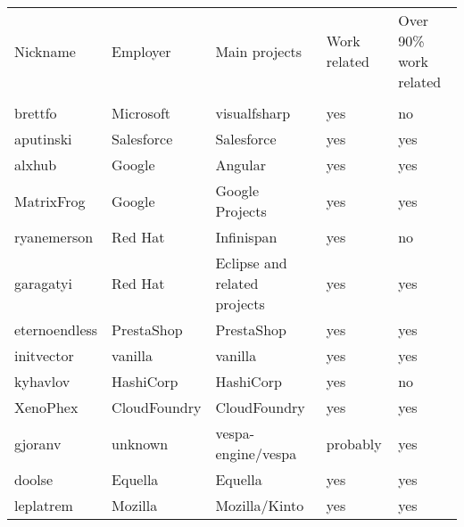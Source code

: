 \begin{landscape}
    \begin{table}[]
        \centering
        \label{tbl:employee-cluster-evaluation}
        \begin{tabular}{lllll}
            Nickname      & Employer     & Main projects                & Work related & Over 90\% work related \\
                          &              &                              &              &                        \\
            brettfo       & Microsoft    & visualfsharp                 & yes          & no                     \\
            aputinski     & Salesforce   & Salesforce                   & yes          & yes                    \\
            alxhub        & Google       & Angular                      & yes          & yes                    \\
            MatrixFrog    & Google       & Google Projects              & yes          & yes                    \\
            ryanemerson   & Red Hat      & Infinispan                   & yes          & no                     \\
            garagatyi     & Red Hat      & Eclipse and related projects & yes          & yes                    \\
            eternoendless & PrestaShop   & PrestaShop                   & yes          & yes                    \\
            initvector    & vanilla      & vanilla                      & yes          & yes                    \\
            kyhavlov      & HashiCorp    & HashiCorp                    & yes          & no                     \\
            XenoPhex      & CloudFoundry & CloudFoundry                 & yes          & yes                    \\
            gjoranv       & unknown      & vespa-engine/vespa           & probably     & yes                    \\
            doolse        & Equella      & Equella                      & yes          & yes                    \\
            leplatrem     & Mozilla      & Mozilla/Kinto                & yes          & yes                    \\

\end{tabular}
\end{table}
\end{landscape}
